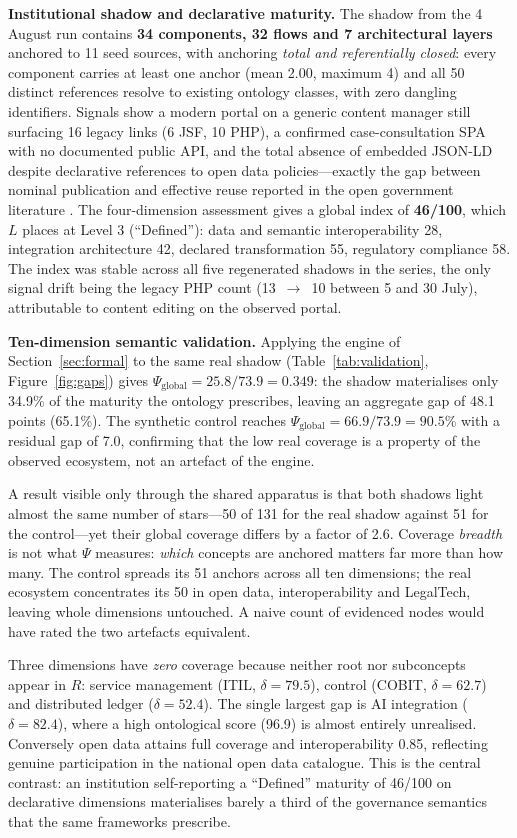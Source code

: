 \documentclass[engproc,proceedingpaper,submit,moreauthors]{Definitions/mdpi}
\begin{document}
\textbf{Institutional shadow and declarative maturity.} The shadow from the 4 August run contains \textbf{34 components, 32 flows and 7 architectural layers} anchored to 11 seed sources, with anchoring \emph{total and referentially closed}: every component carries at least one anchor (mean 2.00, maximum 4) and all 50 distinct references resolve to existing ontology classes, with zero dangling identifiers. Signals show a modern portal on a generic content manager still surfacing 16 legacy links (6 JSF, 10 PHP), a confirmed case-consultation SPA with no documented public API, and the total absence of embedded JSON-LD despite declarative references to open data policies---exactly the gap between nominal publication and effective reuse reported in the open government literature \cite{Janssen2012,Attard2015}. The four-dimension assessment gives a global index of \textbf{46/100}, which $L$ places at Level 3 (``Defined''): data and semantic interoperability 28, integration architecture 42, declared transformation 55, regulatory compliance 58. The index was stable across all five regenerated shadows in the series, the only signal drift being the legacy PHP count (13~$\rightarrow$~10 between 5 and 30 July), attributable to content editing on the observed portal.

\textbf{Ten-dimension semantic validation.} Applying the engine of Section~\ref{sec:formal} to the same real shadow (Table~\ref{tab:validation}, Figure~\ref{fig:gaps}) gives $\Psi_{\mathrm{global}}=25.8/73.9=\mathbf{0.349}$: the shadow materialises only 34.9\% of the maturity the ontology prescribes, leaving an aggregate gap of 48.1 points (65.1\%). The synthetic control reaches $\Psi_{\mathrm{global}}=66.9/73.9=90.5\%$ with a residual gap of 7.0, confirming that the low real coverage is a property of the observed ecosystem, not an artefact of the engine.

A result visible only through the shared apparatus is that both shadows light almost the same number of stars---50 of 131 for the real shadow against 51 for the control---yet their global coverage differs by a factor of 2.6. Coverage \emph{breadth} is not what $\Psi$ measures: \emph{which} concepts are anchored matters far more than how many. The control spreads its 51 anchors across all ten dimensions; the real ecosystem concentrates its 50 in open data, interoperability and LegalTech, leaving whole dimensions untouched. A naive count of evidenced nodes would have rated the two artefacts equivalent.

Three dimensions have \emph{zero} coverage because neither root nor subconcepts appear in $R$: service management (ITIL, $\delta=79.5$), control (COBIT, $\delta=62.7$) and distributed ledger ($\delta=52.4$). The single largest gap is AI integration ($\delta=82.4$), where a high ontological score (96.9) is almost entirely unrealised. Conversely open data attains full coverage and interoperability 0.85, reflecting genuine participation in the national open data catalogue. This is the central contrast: an institution self-reporting a ``Defined'' maturity of 46/100 on declarative dimensions materialises barely a third of the governance semantics that the same frameworks prescribe.
\end{document}
